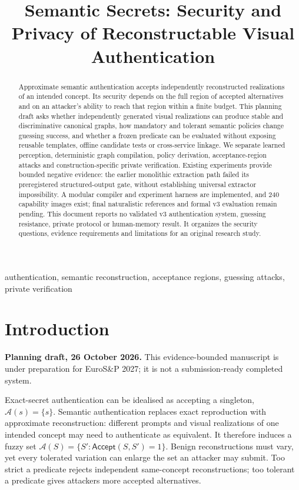 \documentclass[compsoc,conference,a4paper,10pt,times]{IEEEtran}
\title{Semantic Secrets: Security and Privacy of Reconstructable Visual Authentication}
\author{}
\begin{document}
\maketitle
\begin{abstract}
Approximate semantic authentication accepts independently reconstructed realizations of an intended concept. Its security depends on the full region of accepted alternatives and on an attacker's ability to reach that region within a finite budget. This planning draft asks whether independently generated visual realizations can produce stable and discriminative canonical graphs, how mandatory and tolerant semantic policies change guessing success, and whether a frozen predicate can be evaluated without exposing reusable templates, offline candidate tests or cross-service linkage. We separate learned perception, deterministic graph compilation, policy derivation, acceptance-region attacks and construction-specific private verification. Existing experiments provide bounded negative evidence: the earlier monolithic extraction path failed its preregistered structured-output gate, without establishing universal extractor impossibility. A modular compiler and experiment harness are implemented, and 240 capability images exist; final naturalistic references and formal v3 evaluation remain pending. This document reports no validated v3 authentication system, guessing resistance, private protocol or human-memory result. It organizes the security questions, evidence requirements and limitations for an original research study.
\end{abstract}
\begin{IEEEkeywords}
authentication, semantic reconstruction, acceptance regions, guessing attacks, private verification
\end{IEEEkeywords}

\section{Introduction}
\label{sec:introduction}
\noindent\textbf{Planning draft, 26 October 2026.} This evidence-bounded manuscript is under preparation for EuroS\&P 2027; it is not a submission-ready completed system.

Exact-secret authentication can be idealised as accepting a singleton, $\mathcal{A}(s)=\{s\}$. Semantic authentication replaces exact reproduction with approximate reconstruction: different prompts and visual realizations of one intended concept may need to authenticate as equivalent. It therefore induces a fuzzy set $\mathcal{A}(S)=\{S':\mathsf{Accept}(S,S')=1\}$. Benign reconstructions must vary, yet every tolerated variation can enlarge the set an attacker may submit. Too strict a predicate rejects independent same-concept reconstructions; too tolerant a predicate gives attackers more accepted alternatives.
\end{document}
